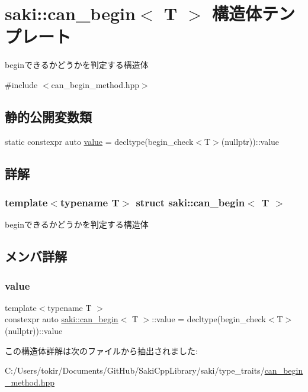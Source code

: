 \hypertarget{structsaki_1_1can__begin}{}\section{saki\+:\+:can\+\_\+begin$<$ T $>$ 構造体テンプレート}
\label{structsaki_1_1can__begin}


beginできるかどうかを判定する構造体  




{\ttfamily \#include $<$can\+\_\+begin\+\_\+method.\+hpp$>$}

\subsection*{静的公開変数類}
\begin{DoxyCompactItemize}
\item 
static constexpr auto \mbox{\hyperlink{structsaki_1_1can__begin_a6d16b8cbacbf7d9be197d09c517d503d}{value}} = decltype(begin\+\_\+check$<$T$>$(nullptr))\+::value
\end{DoxyCompactItemize}


\subsection{詳解}
\subsubsection*{template$<$typename T$>$\newline
struct saki\+::can\+\_\+begin$<$ T $>$}

beginできるかどうかを判定する構造体 

\subsection{メンバ詳解}
\mbox{\label{structsaki_1_1can__begin_a6d16b8cbacbf7d9be197d09c517d503d}} 
\subsubsection{\texorpdfstring{value}{value}}
{\footnotesize\ttfamily template$<$typename T $>$ \\
constexpr auto \mbox{\hyperlink{structsaki_1_1can__begin}{saki\+::can\+\_\+begin}}$<$ T $>$\+::value = decltype(begin\+\_\+check$<$T$>$(nullptr))\+::value\hspace{0.3cm}{\ttfamily [static]}}



この構造体詳解は次のファイルから抽出されました\+:\begin{DoxyCompactItemize}
\item 
C\+:/\+Users/tokir/\+Documents/\+Git\+Hub/\+Saki\+Cpp\+Library/saki/type\+\_\+traits/\mbox{\hyperlink{can__begin__method_8hpp}{can\+\_\+begin\+\_\+method.\+hpp}}\end{DoxyCompactItemize}
